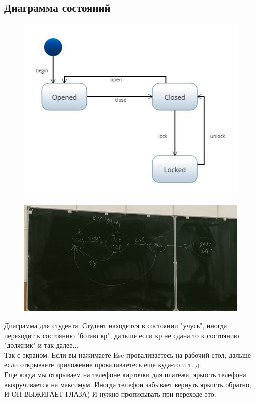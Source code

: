 \documentclass[12pt; a4paper]{book}
\begin{document}
\subsection{Диаграмма состояний}
\begin{figure}[!htbp]
\includegraphics[angle=0, width=\textwidth]{IMG/4} \\
\end{figure}
\begin{figure}[!htbp]
\includegraphics[angle=0, width=\textwidth]{IMG/IMG_0820.jpg} \\
\end{figure}
Диаграмма для студента:
Студент находится в состоянии "учусь", иногда переходит к состоянию "ботаю кр", дальше если кр не сдана то к состоянию "должник" и так далее...\\

Так с экраном. Если вы нажимаете Esc проваливаетесь на рабочий стол, дальше если открываете приложение проваливаетесь еще куда-то и т. д. \\
Еще когда мы открываем на телефоне карточки для платежа, яркость телефона выкручивается на максимум. Иногда телефон забывает вернуть яркость обратно, И ОН ВЫЖИГАЕТ ГЛАЗА) И нужно прописывать при переходе это.
\newpage
\end{document}
